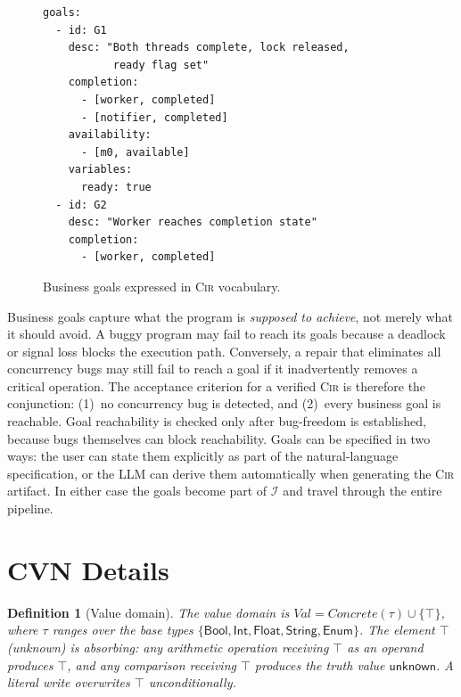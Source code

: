 \documentclass{article}
\newtheorem{definition}{Definition}
\begin{document}
\begin{figure}[h]
\begin{lstlisting}[basicstyle=\small\ttfamily,frame=single]
goals:
  - id: G1
    desc: "Both threads complete, lock released,
           ready flag set"
    completion:
      - [worker, completed]
      - [notifier, completed]
    availability:
      - [m0, available]
    variables:
      ready: true
  - id: G2
    desc: "Worker reaches completion state"
    completion:
      - [worker, completed]
\end{lstlisting}
\caption{Business goals expressed in \textsc{Cir} vocabulary.}
\label{fig:goals-example}
\end{figure}

Business goals capture what the program is \emph{supposed to achieve},
not merely what it should avoid.  A buggy program may fail to reach
its goals because a deadlock or signal loss blocks the execution path.
Conversely, a repair that eliminates all concurrency bugs may still
fail to reach a goal if it inadvertently removes a critical operation.
The acceptance criterion for a verified \textsc{Cir} is therefore the
conjunction: (1)~no concurrency bug is detected, and (2)~every
business goal is reachable.  Goal reachability is checked only after
bug-freedom is established, because bugs themselves can block
reachability.  Goals can be specified in two ways: the user can state
them explicitly as part of the natural-language specification, or the
LLM can derive them automatically when generating the \textsc{Cir}
artifact.  In either case the goals become part of $\mathcal{I}$ and
travel through the entire pipeline.

\section{CVN Details}
\label{app:cvn-details}

\begin{definition}[Value domain]
\label{def:val}
The value domain is
$\mathit{Val}=\mathit{Concrete}(\tau)\cup\{\top\}$, where $\tau$
ranges over the base types
$\{\textsf{Bool},\textsf{Int},\textsf{Float},\textsf{String},
\textsf{Enum}\}$.  The element $\top$ (\emph{unknown}) is absorbing:
any arithmetic operation receiving $\top$ as an operand
produces $\top$, and any comparison receiving $\top$ produces the
truth value $\mathsf{unknown}$.  A literal write overwrites $\top$
unconditionally.
\end{definition}
\end{document}
